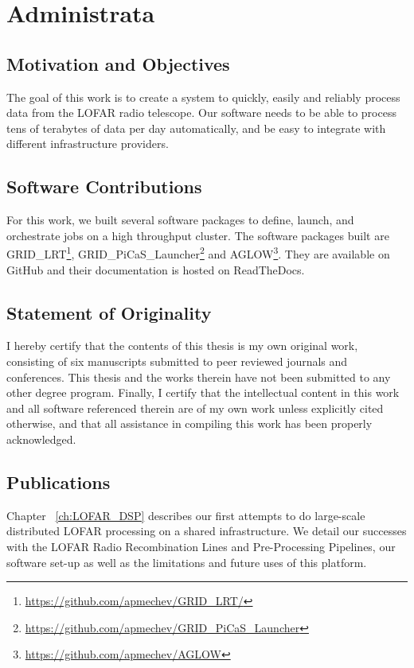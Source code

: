 \section{Administrata}

\subsection{Motivation and Objectives}

The goal of this work is to create a system to quickly, easily and reliably process data from the LOFAR radio telescope. Our software needs to be able to process tens of terabytes of data per day automatically, and be easy to integrate with different infrastructure providers.   

\subsection{Software Contributions}
 
For this work, we built several software packages to define, launch, and orchestrate jobs on a high throughput cluster. The software packages built are GRID\_LRT\footnote{\url{https://github.com/apmechev/GRID_LRT/}}, GRID\_PiCaS\_Launcher\footnote{\url{https://github.com/apmechev/GRID_PiCaS_Launcher}} and AGLOW\footnote{\url{https://github.com/apmechev/AGLOW}}. They are available on GitHub and their documentation is hosted on ReadTheDocs. 


\subsection{Statement of Originality}

I hereby certify that the contents of this thesis is my own original work, consisting of six manuscripts submitted to peer reviewed journals and conferences. This thesis and the works therein have not been submitted to any other degree program. Finally, I certify that the intellectual content in this work and all software referenced therein are of my own work unless explicitly cited otherwise, and that all assistance in compiling this work has been properly acknowledged.

\subsection{Publications}

Chapter ~\ref{ch:LOFAR_DSP} describes our first attempts to do large-scale distributed LOFAR processing on a shared infrastructure. We detail our successes with the LOFAR Radio Recombination Lines and Pre-Processing Pipelines, our software set-up as well as the limitations and future uses of this platform.  


